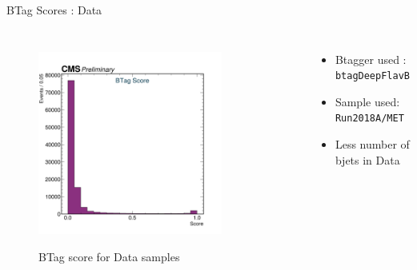 \documentclass[10pt,xcolor=dvipsnames,aspectratio=169]{beamer}
\begin{document}
    
  \begin{frame}[fragile]{BTag Scores : Data} 
    \begin{columns}
      \begin{figure} 
        \centering 
        \includegraphics[width=0.8\textwidth]{../Archive/KinemPlots/TagData.png }
        \label{TagData} 
        \caption{BTag score for Data samples}
      \end{figure} 
      \begin{itemize} 
        \raggedright 
        \small
        \item {Btagger used : \texttt{btagDeepFlavB}} 
        \item {Sample used: \texttt{Run2018A/MET}} 
        \item Less number of bjets in Data
      \end{itemize}
    \end{columns} 
  \end{frame} 
    
\end{document}
